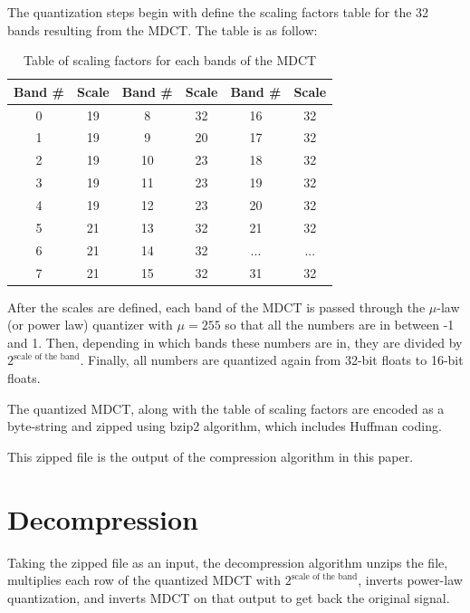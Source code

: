 \documentclass[conference]{IEEEtran}
\begin{document}
	The quantization steps begin with define the scaling factors table for the 32 bands resulting from the MDCT. The table is as follow:
	
	\begin{table}[htbp]
		\caption{Table of scaling factors for each bands of the MDCT}
		\begin{center}
			\begin{tabular}{|c|c|c|c|c|c|}
				\hline
				\textbf{Band \#}&\textbf{Scale}&\textbf{Band \#}&\textbf{Scale}&\textbf{Band \#}&\textbf{Scale} \\
				\hline
				0 & 19 & 8 & 32 & 16 & 32 \\
				\hline
				1 & 19 & 9 & 20 & 17 & 32 \\
				\hline
				2 & 19 & 10 & 23 & 18 & 32 \\
				\hline
				3 & 19 & 11 & 23 & 19 & 32 \\
				\hline
				4 & 19 & 12 & 23 & 20 & 32 \\
				\hline
				5 & 21 & 13 & 32 & 21 & 32 \\
				\hline
				6 & 21 & 14 & 32 & ... & ... \\
				\hline
				7 & 21 & 15 & 32 & 31 & 32 \\
				\hline
			\end{tabular}
			\label{tab1}
		\end{center}
	\end{table}
	
	After the scales are defined, each band of the MDCT is passed through the $\mu$-law (or power law) quantizer with $\mu = 255$ so that all the numbers are in between -1 and 1. Then, depending in which bands these numbers are in, they are divided by $2^{\text{scale of the band}}$. Finally, all numbers are quantized again from 32-bit floats to 16-bit floats. 
	
	The quantized MDCT, along with the table of scaling factors are encoded as a byte-string and zipped using bzip2 algorithm, which includes Huffman coding. 
	
	This zipped file is the output of the compression algorithm in this paper.
	
	\section{Decompression}
	
	Taking the zipped file as an input, the decompression algorithm unzips the file, multiplies each row of the quantized MDCT with $2^{\text{scale of the band}}$, inverts power-law quantization, and inverts MDCT on that output to get back the original signal.
	
\end{document}
